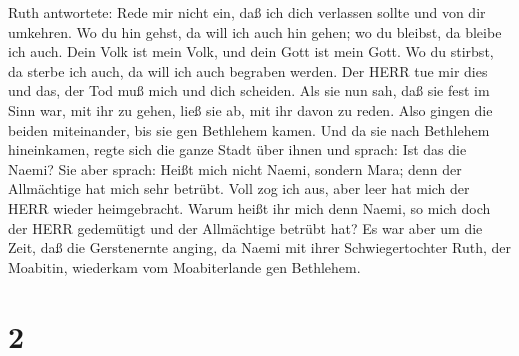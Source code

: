  Ruth antwortete: Rede mir nicht ein, daß ich dich
verlassen sollte und von dir umkehren. Wo du hin gehst, da will ich auch
hin gehen; wo du bleibst, da bleibe ich auch. Dein Volk ist mein Volk,
und dein Gott ist mein Gott.  Wo du stirbst, da sterbe ich
auch, da will ich auch begraben werden. Der HERR tue mir dies und das,
der Tod muß mich und dich scheiden.  Als sie nun sah, daß
sie fest im Sinn war, mit ihr zu gehen, ließ sie ab, mit ihr davon zu
reden.  Also gingen die beiden miteinander, bis sie gen
Bethlehem kamen. Und da sie nach Bethlehem hineinkamen, regte sich die
ganze Stadt über ihnen und sprach: Ist das die Naemi?  Sie
aber sprach: Heißt mich nicht Naemi, sondern Mara; denn der Allmächtige
hat mich sehr betrübt.  Voll zog ich aus, aber leer hat
mich der HERR wieder heimgebracht. Warum heißt ihr mich denn Naemi, so
mich doch der HERR gedemütigt und der Allmächtige betrübt hat?
 Es war aber um die Zeit, daß die Gerstenernte anging, da
Naemi mit ihrer Schwiegertochter Ruth, der Moabitin, wiederkam vom
Moabiterlande gen Bethlehem.

\hypertarget{section-1}{%
\section{2}\label{section-1}}

